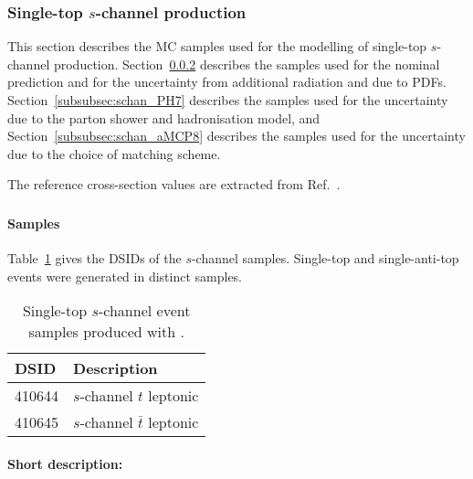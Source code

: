 \subsubsection{Single-top \texorpdfstring{$s$}{s}-channel production}
\label{subsec:schan}

This section describes the MC samples used for the modelling of single-top $s$-channel production.
Section~\ref{subsubsec:schan_PP8} describes the \POWPY[8] samples used for the nominal prediction
and for the uncertainty from additional radiation and due to PDFs.
Section~\ref{subsubsec:schan_PH7} describes the \POWHER[7] samples used for the uncertainty due to the parton shower and hadronisation model,
and Section~\ref{subsubsec:schan_aMCP8} describes the \MGNLOPY[8] samples used for the uncertainty due to the choice of matching scheme.

The reference cross-section values are extracted from Ref.~\cite{LHCTopWGsgtopXsec}.

\subsubsection[Powheg+Pythia8]{\POWPY[8]}
\label{subsubsec:schan_PP8}

\paragraph{Samples}

Table~\ref{tab:schan_PP8} gives the DSIDs of the $s$-channel \POWPY[8] samples.
Single-top and single-anti-top events were generated in distinct samples.

\begin{table}[htbp]
  \caption{Single-top $s$-channel event samples produced with \POWPY[8].}%
  \label{tab:schan_PP8}
  \centering
  \begin{tabular}{l l}
    \toprule
    DSID & Description \\
    \midrule
    410644 & $s$-channel $t$ leptonic \\
    410645 & $s$-channel $\bar{t}$ leptonic \\
    \bottomrule
  \end{tabular}
\end{table}

\paragraph{Short description:}

